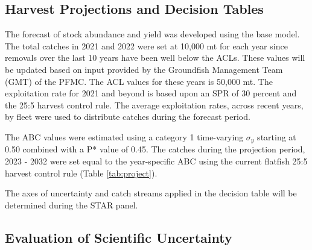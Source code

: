 \documentclass[11pt,
  english,
  a4paper,
]{article}
\begin{document}

\hypertarget{harvest-projections-and-decision-tables}{%
\subsection{Harvest Projections and Decision Tables}\label{harvest-projections-and-decision-tables}}

\leavevmode\tagmcend\tagstructend


The forecast of stock abundance and yield was developed using the base model. The total catches in 2021 and 2022 were set at 10,000 mt for each year since removals over the last 10 years have been well below the ACLs. These values will be updated based on input provided by the Groundfish Management Team (GMT) of the PFMC. The ACL values for these years is 50,000 mt. The exploitation rate for 2021 and beyond is based upon an SPR of 30 percent and the 25:5 harvest control rule. The average exploitation rates, across recent years, by fleet were used to distribute catches during the forecast period.

\leavevmode\tagmcend\tagstructend\par


The ABC values were estimated using a category 1 time-varying {\(\sigma_y\)\leavevmode\tagmcend\tagstructend} starting at 0.50 combined with a P* value of 0.45. The catches during the projection period, 2023 - 2032 were set equal to the year-specific ABC using the current flatfish 25:5 harvest control rule (Table \ref{tab:project}).

\leavevmode\tagmcend\tagstructend\par


The axes of uncertainty and catch streams applied in the decision table will be determined during the STAR panel.

\leavevmode\tagmcend\tagstructend\par


\hypertarget{evaluation-of-scientific-uncertainty}{%
\subsection{Evaluation of Scientific Uncertainty}\label{evaluation-of-scientific-uncertainty}}
\end{document}

